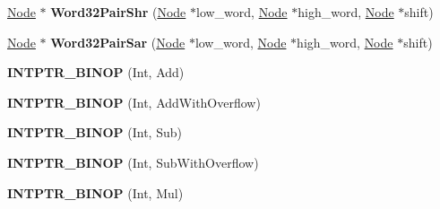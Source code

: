 \begin{DoxyCompactItemize}
\mbox{\hyperlink{classv8_1_1internal_1_1compiler_1_1Node}{Node}} $\ast$ {\bfseries Word32\+Pair\+Shr} (\mbox{\hyperlink{classv8_1_1internal_1_1compiler_1_1Node}{Node}} $\ast$low\+\_\+word, \mbox{\hyperlink{classv8_1_1internal_1_1compiler_1_1Node}{Node}} $\ast$high\+\_\+word, \mbox{\hyperlink{classv8_1_1internal_1_1compiler_1_1Node}{Node}} $\ast$shift)
\item 
\mbox{\label{classv8_1_1internal_1_1compiler_1_1RawMachineAssembler_aed70016fb81161b5f0ed0849407cf487}} 
\mbox{\hyperlink{classv8_1_1internal_1_1compiler_1_1Node}{Node}} $\ast$ {\bfseries Word32\+Pair\+Sar} (\mbox{\hyperlink{classv8_1_1internal_1_1compiler_1_1Node}{Node}} $\ast$low\+\_\+word, \mbox{\hyperlink{classv8_1_1internal_1_1compiler_1_1Node}{Node}} $\ast$high\+\_\+word, \mbox{\hyperlink{classv8_1_1internal_1_1compiler_1_1Node}{Node}} $\ast$shift)
\item 
\mbox{\label{classv8_1_1internal_1_1compiler_1_1RawMachineAssembler_aa771a71f9e4354dbd189d27b4130056c}} 
{\bfseries I\+N\+T\+P\+T\+R\+\_\+\+B\+I\+N\+OP} (Int, Add)
\item 
\mbox{\label{classv8_1_1internal_1_1compiler_1_1RawMachineAssembler_a5f58e6a3a19c3ce74aafb06291a3f4a8}} 
{\bfseries I\+N\+T\+P\+T\+R\+\_\+\+B\+I\+N\+OP} (Int, Add\+With\+Overflow)
\item 
\mbox{\label{classv8_1_1internal_1_1compiler_1_1RawMachineAssembler_aabceaeebcca81cb18dd29b3d20974a97}} 
{\bfseries I\+N\+T\+P\+T\+R\+\_\+\+B\+I\+N\+OP} (Int, Sub)
\item 
\mbox{\label{classv8_1_1internal_1_1compiler_1_1RawMachineAssembler_a831468597d0f1c1b9af9ac03fb13f1a7}} 
{\bfseries I\+N\+T\+P\+T\+R\+\_\+\+B\+I\+N\+OP} (Int, Sub\+With\+Overflow)
\item 
\mbox{\label{classv8_1_1internal_1_1compiler_1_1RawMachineAssembler_a2a8203fac01383ff84e95fdb57c8cdea}} 
{\bfseries I\+N\+T\+P\+T\+R\+\_\+\+B\+I\+N\+OP} (Int, Mul)
\item 

\end{DoxyCompactItemize}
